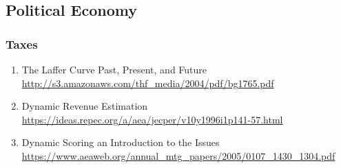 \documentclass{article}
\begin{document}
\subsection {Political Economy}
\subsubsection{Taxes}
\begin{enumerate}
	\item {The Laffer Curve Past, Present, and Future\\
\url{http://s3.amazonaws.com/thf_media/2004/pdf/bg1765.pdf}}
	\item {Dynamic Revenue Estimation\\
\url{https://ideas.repec.org/a/aea/jecper/v10y1996i1p141-57.html}}
	\item {Dynamic Scoring an Introduction to the Issues\\
\url{https://www.aeaweb.org/annual_mtg_papers/2005/0107_1430_1304.pdf}}
\end{enumerate}
\end{document}
